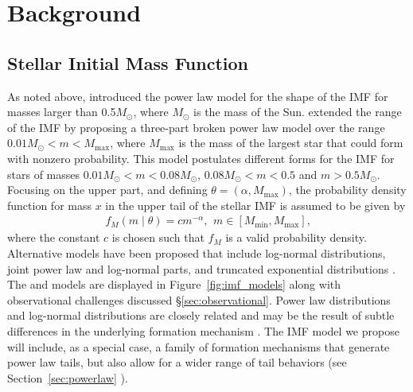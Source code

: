 \documentclass[ejs]{imsart}
\numberwithin{equation}{section}
\theoremstyle{plain}
\newcommand{\Msun}{M_{\odot}}
\newcommand{\Mmax}{M_{\text{max}}}
\newcommand{\Mmin}{M_{\text{min}}}
\begin{document}
\section{Background}
\label{sec:background}
\subsection{Stellar Initial Mass Function}

As noted above, \cite{salpeter55} introduced the power law model for the shape of the IMF for masses larger
than 0.5$\Msun$, where $\Msun$ is the mass of the Sun.
\cite{kroupa2001} extended the range of the IMF by proposing a three-part broken power law model 
over the range $0.01 \Msun < m < \Mmax$, where $\Mmax$ is the mass of the largest star that could form with nonzero probability.
This model postulates different forms for the IMF for stars of masses $0.01 \Msun < m < 0.08 \Msun$,
$0.08 \Msun < m < 0.5$ and $m > 0.5\Msun$.
Focusing on the upper part, and defining $\theta = (\alpha, \Mmax)$, the probability density function for mass $x$ in the upper tail of the stellar IMF is assumed to be given by
\begin{align}
	f_M(m \mid \theta) = cm^{-\alpha}\text{,}\;\; m \in [\Mmin, \Mmax]\text{,}
	\label{eq:imf}
\end{align}
where the constant $c$ is chosen such that $f_M$ is a valid probability density.  Alternative models have been proposed that include log-normal distributions, joint power law and log-normal parts, and truncated exponential distributions  \citep{Chabrier:2003om, Chabrier:2003oq, chabrier2005,IMF50,bastian2010, OffnerEtAl2014}.  The \cite{kroupa2001} and \cite{Chabrier:2003om, Chabrier:2003oq} models are displayed in Figure~\ref{fig:imf_models} along with observational challenges discussed \S\ref{sec:observational}.
Power law distributions and log-normal distributions are closely related and may be the result of subtle differences in the underlying formation mechanism \citep{Mitzenmacher2004}.  
The IMF model we propose will include, as a special case, a family of formation mechanisms that generate
power law tails, but also allow for a wider range of tail behaviors (see Section~\ref{sec:powerlaw} ).
\end{document}
